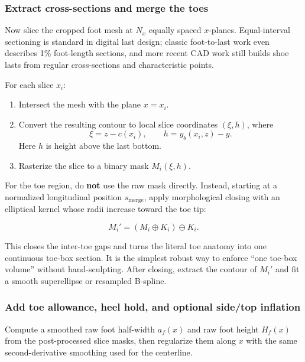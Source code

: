 \documentclass[
  10.5pt,
]{article}
\providecommand{\tightlist}{%
  \setlength{\itemsep}{0pt}\setlength{\parskip}{0pt}}
\begin{document}
\subsubsection{Extract cross-sections and merge the
toes}\label{extract-cross-sections-and-merge-the-toes}

Now slice the cropped foot mesh at \(N_x\) equally spaced \(x\)-planes.
Equal-interval sectioning is standard in digital last design; classic
foot-to-last work even describes 1\% foot-length sections, and more
recent CAD work still builds shoe lasts from regular cross-sections and
characteristic points.

For each slice \(x_i\):

\begin{enumerate}
\def\labelenumi{\arabic{enumi}.}
\tightlist
\item
  Intersect the mesh with the plane \(x=x_i\).
\item
  Convert the resulting contour to local slice coordinates \((\xi, h)\),
  where \[
  \xi = z-c(x_i), \qquad h = y_b(x_i,z)-y.
  \] Here \(h\) is height above the last bottom.
\item
  Rasterize the slice to a binary mask \(M_i(\xi,h)\).
\end{enumerate}

For the toe region, do \textbf{not} use the raw mask directly. Instead,
starting at a normalized longitudinal position \(s_{\text{merge}}\),
apply morphological closing with an elliptical kernel whose radii
increase toward the toe tip:

\[
M_i' = (M_i \oplus K_i)\ominus K_i.
\]

This closes the inter-toe gaps and turns the literal toe anatomy into
one continuous toe-box section. It is the simplest robust way to enforce
``one toe-box volume'' without hand-sculpting. After closing, extract
the contour of \(M_i'\) and fit a smooth superellipse or resampled
B-spline.

\subsubsection{Add toe allowance, heel hold, and optional side/top
inflation}\label{add-toe-allowance-heel-hold-and-optional-sidetop-inflation}

Compute a smoothed raw foot half-width \(a_f(x)\) and raw foot height
\(H_f(x)\) from the post-processed slice masks, then regularize them
along \(x\) with the same second-derivative smoothing used for the
centerline.
\end{document}
